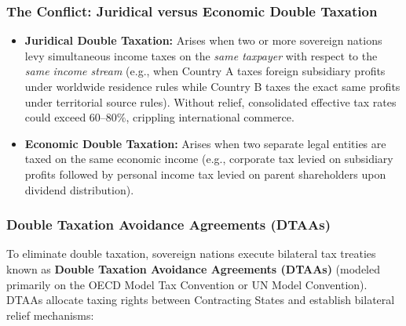 \subsubsection{The Conflict: Juridical versus Economic Double Taxation}
\begin{itemize}[leftmargin=1.5em]
    \item \textbf{Juridical Double Taxation:} Arises when two or more sovereign nations levy simultaneous income taxes on the \textit{same taxpayer} with respect to the \textit{same income stream} (e.g., when Country A taxes foreign subsidiary profits under worldwide residence rules while Country B taxes the exact same profits under territorial source rules). Without relief, consolidated effective tax rates could exceed $60\text{--}80\%$, crippling international commerce.
    \item \textbf{Economic Double Taxation:} Arises when two separate legal entities are taxed on the same economic income (e.g., corporate tax levied on subsidiary profits followed by personal income tax levied on parent shareholders upon dividend distribution).
\end{itemize}

\subsubsection{Double Taxation Avoidance Agreements (DTAAs)}
To eliminate double taxation, sovereign nations execute bilateral tax treaties known as \textbf{Double Taxation Avoidance Agreements (DTAAs)} (modeled primarily on the OECD Model Tax Convention or UN Model Convention). DTAAs allocate taxing rights between Contracting States and establish bilateral relief mechanisms:

